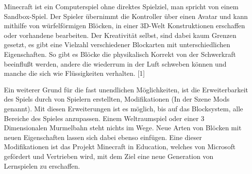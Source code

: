 Minecraft ist ein Computerspiel ohne direktes Spielziel, man spricht von einem Sandbox-Spiel.
Der Spieler übernimmt die Kontroller über einen Avatar und kann mithilfe von würfelförmigen Blöcken,
in einer 3D-Welt Konstruktionen erschaffen oder vorhandene bearbeiten. Der Kreativität selbst,
sind dabei kaum Grenzen gesetzt, es gibt eine Vielzahl verschiedener Blockarten mit unterschiedlichen
Eigenschaften. So gibt es Blöcke die physikalisch Korrekt von der Schwerkraft beeinflußt werden,
andere die wiederrum in der Luft schweben können und manche die sich wie Flüssigkeiten verhalten.
[1]

Ein weiterer Grund für die fast unendlichen Möglichkeiten, ist die Erweiterbarkeit des Spiels durch
von Spielern erstellten, Modifikationen (In der Szene Mods genannt). Mit diesen Erweiterungen ist es
möglich, bis auf das Blocksystem, alle Bereiche des Spieles anzupassen. Einem Weltraumspiel oder einer
3 Dimensionalen Murmelbahn steht nichts im Wege. Neue Arten von Blöcken mit neuen Eigenschaften lassen
sich dabei ebenso einfügen. Eine dieser Modifikationen ist das Projekt Minecraft in Education, welches
von Microsoft gefördert und Vertrieben wird, mit dem Ziel eine neue Generation von Lernspielen zu erschaffen.
